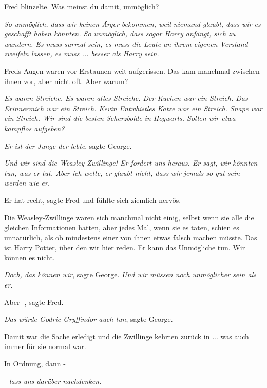 Fred blinzelte. \glqq{}Was meinst du damit, unmöglich?\grqq{}

\glqq{}\emph{So unmöglich, dass wir keinen Ärger bekommen, weil niemand glaubt,
dass wir es geschafft haben könnten. So unmöglich, dass sogar Harry anfängt,
sich zu wundern. Es muss surreal sein, es muss die Leute an ihrem eigenen
Verstand zweifeln lassen, es muss ... \emph{besser als} Harry sein.}\grqq{}

Freds Augen waren vor Erstaunen weit aufgerissen. Das kam manchmal zwischen
ihnen vor, aber nicht oft. \glqq{}Aber warum?\grqq{}

\glqq{}\emph{Es waren Streiche. Es waren alles Streiche. Der Kuchen war ein
Streich. Das Erinnermich war ein Streich. Kevin Entwhistles Katze war ein
Streich. Snape war ein Streich. Wir sind die besten Scherzbolde in Hogwarts.
Sollen wir etwa kampflos aufgeben?}\grqq{}

\glqq{}\emph{Er ist der Junge-der-lebte}\grqq{}, sagte George.

\glqq{}\emph{Und wir sind die Weasley-Zwillinge! Er fordert uns heraus. Er sagt,
wir könnten tun, was er tut. Aber ich wette, er glaubt nicht, dass wir jemals so
gut sein werden wie er.}\grqq{}

\glqq{}Er hat recht\grqq{}, sagte Fred und fühlte sich ziemlich nervös.

Die Weasley-Zwillinge waren sich manchmal nicht einig, selbst wenn sie alle die
gleichen Informationen hatten, aber jedes Mal, wenn sie es taten, schien es
unnatürlich, als ob mindestens einer von ihnen etwas falsch machen müsste.
\glqq{}Das ist Harry Potter, über den wir hier reden. Er kann das Unmögliche
tun. Wir können es nicht.\grqq{}

\glqq{}\emph{Doch, das können wir}\grqq{}, sagte George. \glqq{}\emph{Und wir
müssen noch unmöglicher sein als er.}\grqq{}

\glqq{}Aber -\grqq{}, sagte Fred.

\glqq{}\emph{Das würde Godric Gryffindor auch tun}\grqq{}, sagte George.

Damit war die Sache erledigt und die Zwillinge kehrten zurück in ... was auch
immer für sie normal war.

\glqq{}In Ordnung, dann -\grqq{}

\glqq{}\emph{- lass uns darüber nachdenken.}\grqq{}
